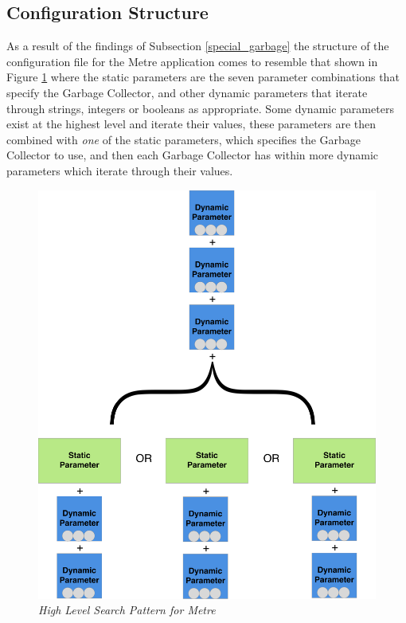 \documentclass[]{final_report}
\begin{document}
\subsection{Configuration Structure}

As a result of the findings of Subsection \ref{special_garbage} the structure of the configuration file for the Metre application comes to resemble that shown in Figure \ref{fig:search_pattern} where the static parameters are the seven parameter combinations that specify the Garbage Collector, and other dynamic parameters that iterate through strings, integers or booleans as appropriate. Some dynamic parameters exist at the highest level and iterate their values, these parameters are then combined with \textit{one} of the static parameters, which specifies the Garbage Collector to use, and then each Garbage Collector has within more dynamic parameters which iterate through their values.

\begin{figure}
\begin{center}
\includegraphics[scale=0.15]{figures/Search_Pattern.pdf}
\caption{\small \sl High Level Search Pattern for Metre \label{fig:search_pattern}}
\end{center} 
\end{figure}
\end{document}
